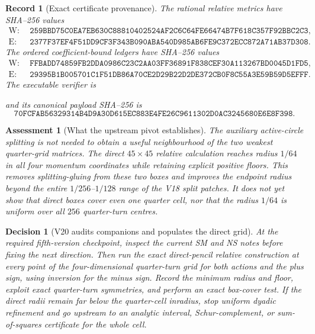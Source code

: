 \documentclass[11pt,oneside]{article}
\newtheorem{assessment}[theorem]{Assessment}
\newtheorem{record}[theorem]{Record}
\newtheorem{decision}[theorem]{Decision}
\theoremstyle{definition}
\theoremstyle{remark}
\begin{document}
\begin{record}[Exact certificate provenance]
\label{rec:newv19-provenance}
The rational relative metrics have SHA--256 values
\[
\begin{aligned}
\mathrm W:\;&
\texttt{259BBD75C0EA7EB630C88810402524AF2C6C64FE66474B7F618C357F92BBC2C3},\\
\mathrm E:\;&
\texttt{2377F37EF4F51DD9CF3F343B090ABA540D985AB6FE9C372ECC872A71AB37D308}.
\end{aligned}                                            \tag{19.15}
\]
The ordered coefficient-bound ledgers have SHA--256 values
\[
\begin{aligned}
\mathrm W:\;&
\texttt{FFBADD74859FB2DDA0986C23C2AA03FF36891F838CEF30A113267BD0045D1FD5},\\
\mathrm E:\;&
\texttt{29395B1B005701C1F51DB86A70CE2D29B22D2DE372CB0F8C55A3E59B59D5EFFF}.
\end{aligned}                                            \tag{19.16}
\]
The executable verifier is
\begin{center}
\footnotesize
{}
\end{center}
and its canonical payload SHA--256 is
\[
\texttt{70FCFAB56329314B4D9A30D615EC883E4FE26C9611302D0AC3245680E6E8F398}.
                                                               \tag{19.17}
\]
\end{record}

\begin{assessment}[What the upstream pivot establishes]
\label{ass:newv19}
The auxiliary active-circle splitting is not needed to obtain a
useful neighbourhood of the two weakest quarter-grid matrices.  The
direct \(45\times45\) relative calculation reaches radius \(1/64\)
in all four momentum coordinates while retaining explicit positive
floors.  This removes splitting-gluing from these two boxes and
improves the endpoint radius beyond the entire \(1/256\)--\(1/128\)
range of the V18 split patches.  It does not yet show that direct
boxes cover even one quarter cell, nor that the radius \(1/64\) is
uniform over all \(256\) quarter-turn centres.
\end{assessment}

\begin{decision}[V20 audits companions and populates the direct grid]
\label{dec:newv19-next}
At the required fifth-version checkpoint, inspect the current SM and
NS notes before fixing the next direction.  Then run the exact
direct-pencil relative construction at every point of the
four-dimensional quarter-turn grid for both actions and the plus
sign, using inversion for the minus sign.  Record the minimum radius
and floor, exploit exact quarter-turn symmetries, and perform an exact
box-cover test.  If the direct radii remain far below the quarter-cell
inradius, stop uniform dyadic refinement and go upstream to an
analytic interval, Schur-complement, or sum-of-squares certificate
for the whole cell.
\end{decision}
\end{document}
